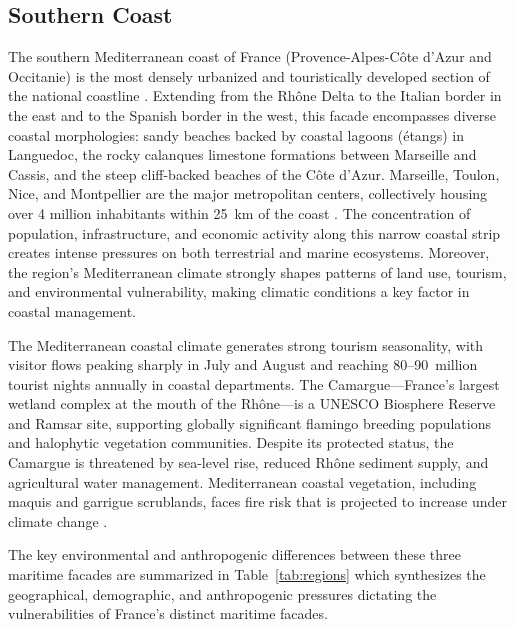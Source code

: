 \documentclass[coasts,article,accept,pdftex,moreauthors]{Definitions/mdpi}
\begin{document}
\subsection{Southern Coast}

The southern Mediterranean coast of France (Provence-Alpes-C\^ote d'Azur and Occitanie) is the most densely urbanized and touristically developed section of the national coastline \citep{viard2002tourisme}. Extending from the Rh\^one Delta to the Italian border in the east and to the Spanish border in the west, this facade encompasses diverse coastal morphologies: sandy beaches backed by coastal lagoons (étangs) in Languedoc, the rocky calanques limestone formations between Marseille and Cassis, and the steep cliff-backed beaches of the Côte d'Azur. Marseille, Toulon, Nice, and Montpellier are the major metropolitan centers, collectively housing over 4 million inhabitants within 25~km of the coast \citep{insee2017littoral}. {The concentration of population, infrastructure, and economic activity along this narrow coastal strip creates intense pressures on both terrestrial and marine ecosystems. Moreover, the region's Mediterranean climate strongly shapes patterns of land use, tourism, and environmental vulnerability, making climatic conditions a key factor in coastal management.}

The Mediterranean coastal climate generates strong tourism seasonality, with visitor flows peaking sharply in July and August and reaching 80--90~million tourist nights annually in coastal departments. The Camargue—France's largest wetland complex at the mouth of the Rhône—is a UNESCO Biosphere Reserve and Ramsar site, supporting globally significant flamingo breeding populations and halophytic vegetation communities. Despite its protected status, the Camargue is threatened by sea-level rise, reduced Rh\^one sediment supply, and agricultural water management. Mediterranean coastal vegetation, including maquis and garrigue scrublands, faces fire risk that is projected to increase under climate change \citep{trabaud2005feux}.

The key environmental and anthropogenic differences between these three maritime facades are summarized in Table~\ref{tab:regions} which synthesizes the geographical, demographic, and anthropogenic pressures dictating the vulnerabilities of France's distinct maritime facades.
\end{document}
